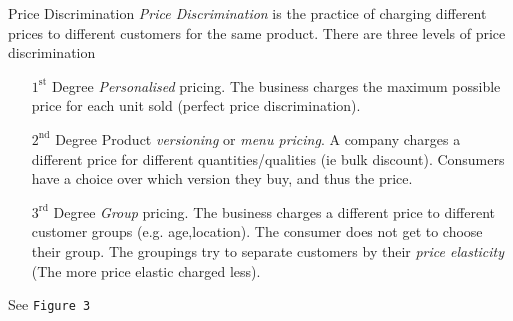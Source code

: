 \documentclass[11pt,a4paper]{article}
\begin{document}
\begin{definition}{Price Discrimination}
  \textit{Price Discrimination} is the practice of charging different prices to different customers for the same product. There are three levels of price discrimination
  \begin{itemize}
    \item[$1^\text{st}$ Degree]  \textit{Personalised} pricing. The business charges the maximum possible price for each unit sold (perfect price discrimination).
    \item[$2^\text{nd}$ Degree]  Product \textit{versioning} or \textit{menu pricing}. A company charges a different price for different quantities/qualities (ie bulk discount). Consumers have a choice over which version they buy, and thus the price.
    \item[$3^\text{rd}$ Degree]  \textit{Group} pricing. The business charges a different price to different customer groups (e.g. age,location). The consumer does not get to choose their group. The groupings try to separate customers by their \textit{price elasticity} (The more price elastic charged less).
  \end{itemize}
  See \texttt{Figure 3}


\end{definition}
\end{document}
